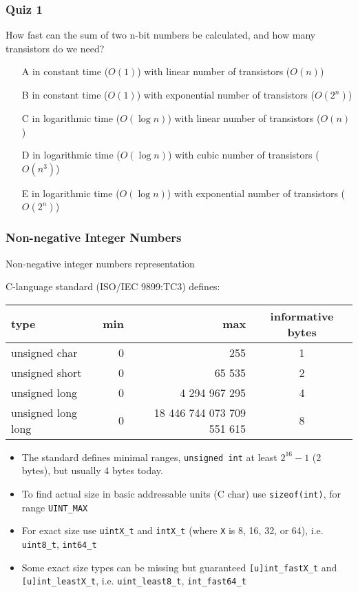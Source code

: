 \documentclass{beamer}
\begin{document}
\begin{frame}
\frametitle{Quiz 1}
How fast can the sum of two n-bit numbers be calculated, and how many transistors do we need?
\begin{itemize}
\item[A] in constant time ($O(1)$) with linear number of transistors ($O(n)$)
\item[B] in constant time ($O(1)$) with exponential number of transistors ($O(2^n)$)
\item[C] in logarithmic time ($O(\log{n})$) with linear number of transistors ($O(n)$)
\item[D] in logarithmic time ($O(\log{n})$) with cubic number of transistors ($O(n^3)$)
\item[E] in logarithmic time ($O(\log{n})$) with exponential number of transistors ($O(2^n)$)
\end{itemize}
\end{frame}


\begin{frame}
\frametitle{Non-negative Integer Numbers}
Non-negative integer numbers representation

C-language standard (ISO/IEC 9899:TC3) defines:
\begin{tabular}{|l|r|r|c|}\hline
type & min & max & informative bytes\\ \hline
unsigned char & 0 & 255 & 1 \\ \hline
unsigned short & 0 & 65 535 & 2 \\ \hline 
unsigned long & 0 & 4 294 967 295 & 4 \\ \hline
unsigned long long & 0 & 18 446 744 073 709 551 615 & 8 \\ \hline
\end{tabular}

\begin{itemize}
\item The standard defines minimal ranges, \texttt{unsigned int} at least $2^{16}-1$ (2 bytes), but usually 4 bytes today.
\item To find actual size in basic addressable units (C char) use \texttt{sizeof(int)}, for range \texttt{UINT\_MAX}
\item For exact size use \texttt{uintX\_t} and \texttt{intX\_t} (where \texttt{X} is 8, 16, 32, or 64), i.e. \texttt{uint8\_t}, \texttt{int64\_t}
\item Some exact size types can be missing but guaranteed \texttt{[u]int\_fastX\_t} and \texttt{[u]int\_leastX\_t}, i.e. \texttt{uint\_least8\_t}, \texttt{int\_fast64\_t}
\end{itemize}

\end{frame}
\end{document}
